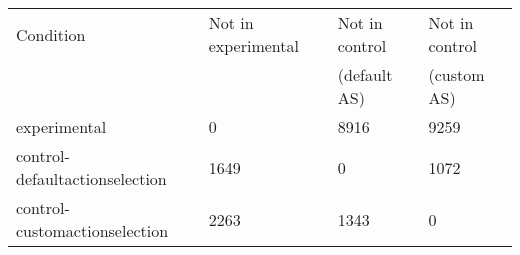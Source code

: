 \begin{center}
\begin{tabular}{|l|l|l|l|}
\hline
Condition & Not in experimental & Not in control & Not in control\\
          &                     & (default AS)   & (custom AS)\\
\hline
experimental & 0 & 8916 & 9259 \\
control-defaultactionselection & 1649 & 0 & 1072 \\
control-customactionselection & 2263 & 1343 & 0 \\
\hline
\end{tabular}
\end{center}
